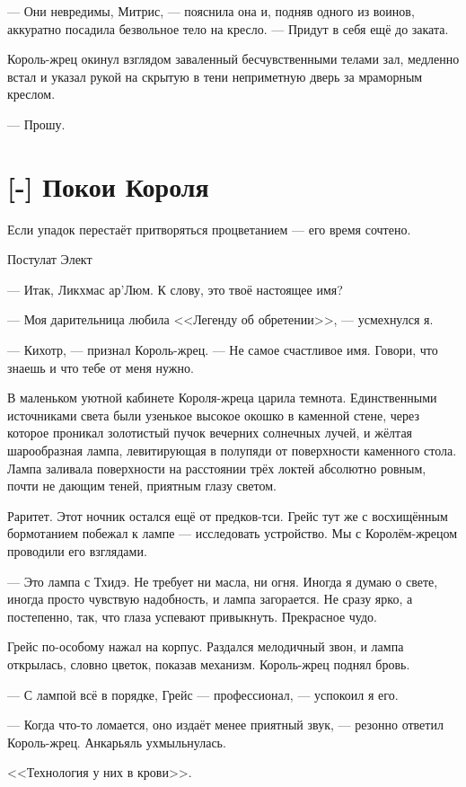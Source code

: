 --- Они невредимы, Митрис, --- пояснила она и, подняв одного из воинов, аккуратно посадила безвольное тело на кресло.
--- Придут в себя ещё до заката.

Король-жрец окинул взглядом заваленный бесчувственными телами зал, медленно встал и указал рукой на скрытую в тени неприметную дверь за мраморным креслом.

--- Прошу.

\section{[-] Покои Короля}

\epigraph
{Если упадок перестаёт притворяться процветанием --- его время сочтено.}
{Постулат Элект}

--- Итак, Ликхмас ар’Люм.
К слову, это твоё настоящее имя?

--- Моя дарительница любила <<Легенду об обретении>>, --- усмехнулся я.

--- Кихотр, --- признал Король-жрец.
--- Не самое счастливое имя.
Говори, что знаешь и что тебе от меня нужно.

В маленьком уютной кабинете Короля-жреца царила темнота.
Единственными источниками света были узенькое высокое окошко в каменной стене, через которое проникал золотистый пучок вечерних солнечных лучей, и жёлтая шарообразная лампа, левитирующая в полупяди от поверхности каменного стола.
Лампа заливала поверхности на расстоянии трёх локтей абсолютно ровным, почти не дающим теней, приятным глазу светом.

Раритет.
Этот ночник остался ещё от предков-тси.
Грейс тут же с восхищённым бормотанием побежал к лампе --- исследовать устройство.
Мы с Королём-жрецом проводили его взглядами.

--- Это лампа с Тхидэ.
Не требует ни масла, ни огня.
Иногда я думаю о свете, иногда просто чувствую надобность, и лампа загорается.
Не сразу ярко, а постепенно, так, что глаза успевают привыкнуть.
Прекрасное чудо.

Грейс по-особому нажал на корпус.
Раздался мелодичный звон, и лампа открылась, словно цветок, показав механизм.
Король-жрец поднял бровь.

--- С лампой всё в порядке, Грейс --- профессионал, --- успокоил я его.

--- Когда что-то ломается, оно издаёт менее приятный звук, --- резонно ответил Король-жрец.
Анкарьяль ухмыльнулась.

<<Технология у них в крови>>.

